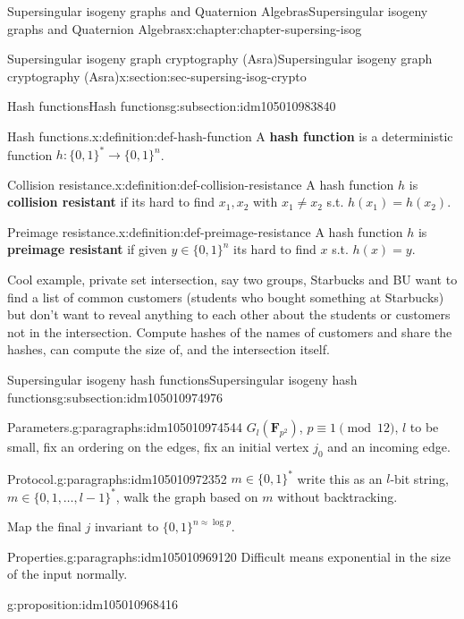 \documentclass[oneside,10pt,]{book}
\newcommand{\terminology}[1]{\textbf{#1}}
\numberwithin{equation}{section}
\newcommand{\FF}{\mathbf{F}}
\begin{document}
\begin{chapterptx}{Supersingular isogeny graphs and Quaternion Algebras}{}{Supersingular isogeny graphs and Quaternion Algebras}{}{}{x:chapter:chapter-supersing-isog}
\begin{sectionptx}{Supersingular isogeny graph cryptography (Asra)}{}{Supersingular isogeny graph cryptography (Asra)}{}{}{x:section:sec-supersing-isog-crypto}
\begin{subsectionptx}{Hash functions}{}{Hash functions}{}{}{g:subsection:idm105010983840}
\begin{definition}{Hash functions.}{x:definition:def-hash-function}
A \terminology{hash function} is a deterministic function \(h\colon \{0,1\}^* \to \{0,1\}^n\).%
\end{definition}
\begin{definition}{Collision resistance.}{x:definition:def-collision-resistance}%
A hash function \(h\) is \terminology{collision resistant} if its hard to find \(x_1,x_2\) with \(x_1\ne x_2 \) s.t. \(h(x_1) = h(x_2)\).%
\end{definition}
\begin{definition}{Preimage resistance.}{x:definition:def-preimage-resistance}%
A hash function \(h\) is \terminology{preimage resistant} if given \(y\in \{0,1\}^n\) its hard to find \(x\) s.t. \(h(x) = y\).%
\end{definition}
Cool example, private set intersection, say two groups, Starbucks and BU want to find a list of common customers (students who bought something at Starbucks) but don't want to reveal anything to each other about the students or customers not in the intersection. Compute hashes of the names of customers and share the hashes, can compute the size of, and the intersection itself.%
\end{subsectionptx}
%
%
\typeout{************************************************}
\typeout{************************************************}
%
\begin{subsectionptx}{Supersingular isogeny hash functions}{}{Supersingular isogeny hash functions}{}{}{g:subsection:idm105010974976}
\begin{paragraphs}{Parameters.}{g:paragraphs:idm105010974544}%
\(G_l(\FF_{p^2})\), \(p \equiv 1 \pmod{12}\), \(l\) to be small, fix an ordering on the edges, fix an initial vertex \(j_0\) and an incoming edge.%
\end{paragraphs}%
\begin{paragraphs}{Protocol.}{g:paragraphs:idm105010972352}%
\(m \in \{0,1\}^*\) write this as an \(l\)-bit string, \(m \in \{0,1,\ldots, l-1\}^*\), walk the graph based on \(m\) without backtracking.%
\par
Map the final \(j\) invariant to  \(\{0,1\}^{n\approx \log p}\).%
\end{paragraphs}%
\begin{paragraphs}{Properties.}{g:paragraphs:idm105010969120}%
Difficult means exponential in the size of the input normally.%
\begin{proposition}{}{}{g:proposition:idm105010968416}%
%
\begin{enumerate}

\end{enumerate}
\end{proposition}
\end{paragraphs}
\end{subsectionptx}
\end{sectionptx}
\end{chapterptx}
\end{document}
